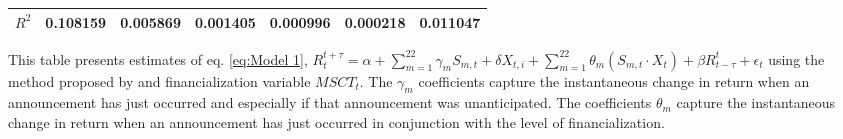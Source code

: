 \begin{sidewaystable}
{\begin{tabular}{@{}lllllllllllll@{}}
                              \\ \textbf{$R^2$}             &\multicolumn{2}{c}{ 0.108159 }                                                 & \multicolumn{2}{c}{ 0.005869 }                                                 & \multicolumn{2}{c}{ 0.001405 }                                                 & \multicolumn{2}{c}{ 0.000996 }                                                 & \multicolumn{2}{c}{ 0.000218 }                                                   & \multicolumn{2}{c}{ 0.011047 }                                                 \\ \bottomrule 
\end{tabular}
}
\begin{tablenotes}\item 
    \singlespacing
    \footnotesize
    This table presents estimates of eq. \ref{eq:Model 1}, $R_{t}^{t+\tau}=\alpha+\sum_{m=1}^{22} \gamma_m S_{m,t}+ \delta X_{t,i} + \sum_{m=1}^{22} \theta_m (S_{m,t} \cdot X_t)+\beta R_{t-\tau}^{t}+\epsilon_{t}$ using the method proposed by \citet{kurov2019price} and financialization variable $MSCT_t$. The $\gamma_m$ coefficients capture the instantaneous change in return when an announcement has just occurred and especially if that announcement was unanticipated. The coefficients $\theta_m$ capture the instantaneous change in return when an announcement has just occurred in conjunction with the level of financialization.
\end{tablenotes}
\end{sidewaystable}



